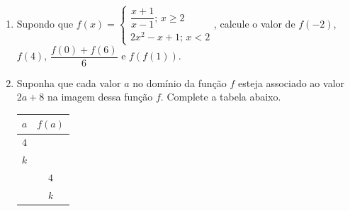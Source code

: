 \documentclass[12pt,a4paper]{article}
\begin{document}
\begin{enumerate}
  \item Supondo que $f(x) = \begin{cases} \dfrac{x + 1}{x - 1};\,x\geq 2 \\ 2x^2 - x + 1;\,x < 2\end{cases}$, 
    calcule o valor de $f(-2)$, $f(4)$, $\dfrac{f(0) + f(6)}{6}$ e $f(f(1))$.

  \item Suponha que cada valor $a$ no domínio da função $f$ esteja associado ao valor $2a + 8$ na imagem dessa 
    função $f$. Complete a tabela abaixo.

    \begin{table}[H]
      \centering
      \begin{tabular}{c|c}
        $a$ & $f(a)$ \\ \hline
        $4$ &  \\ \hline
        $k$ &  \\ \hline
         & $4$ \\ \hline
         & $k$
      \end{tabular}
    \end{table}

\end{enumerate}
\end{document}

